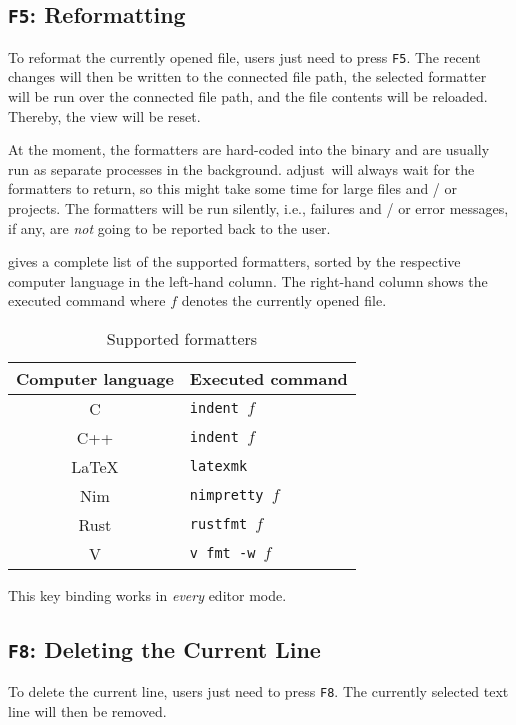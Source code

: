 \documentclass[11pt, a4paper, british]{scrartcl}
\DeclareRobustCommand{\adjust}{\textsf{adjust}}
\begin{document}
\subsection{\texttt{F5}:  Reformatting}
\label{sec:f5-reformatting}
To reformat the currently opened file, users just need to press \texttt{F5}.
The recent changes will then be written to the connected file path, the selected
formatter will be run over the connected file path, and the file contents will
be reloaded.  Thereby, the view will be reset.

At the moment, the formatters are hard-coded into the binary and are usually run
as separate processes in the background.  \adjust\ will always wait for the
formatters to return, so this might take some time for large files and / or
projects.  The formatters will be run silently, i.e., failures and / or error
messages, if any, are \emph{not} going to be reported back to the user.

 gives a complete list of the supported formatters, sorted
by the respective computer language in the left-hand column.  The right-hand
column shows the executed command where \texttt{$f$} denotes the currently
opened file.

\begin{table}
\centering
\caption{Supported formatters}
\label{tab:formatters}
\begin{tabular}{cl}
\toprule
Computer language   & Executed command          \\
\midrule
C                   & \texttt{indent $f$}       \\
C++                 & \texttt{indent $f$}       \\
\LaTeX              & \texttt{latexmk}          \\
Nim                 & \texttt{nimpretty $f$}    \\
Rust                & \texttt{rustfmt $f$}      \\
V                   & \texttt{v fmt -w $f$}     \\
\bottomrule
\end{tabular}
\end{table}

This key binding works in \emph{every} editor mode.

\subsection{\texttt{F8}:  Deleting the Current Line}
\label{sec:f8-deleting-the-current-line}
To delete the current line, users just need to press \texttt{F8}.  The currently
selected text line will then be removed.
\end{document}
